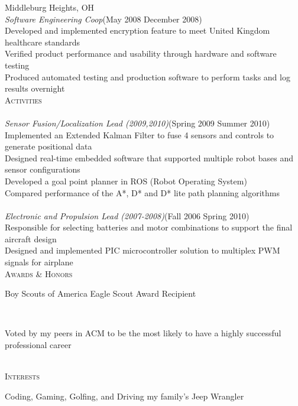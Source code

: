 \documentclass[11pt,letterpaper]{article}
\newcommand{\SectionHeader}[1]{\textsc{#1} \vspace{-2px}\\}
\newcommand{\CompanyHeader}[4]{\hspace*{.52in}{\bf#1} \hfill #2 \\\hspace*{.5in}\emph{#3}\hfill (#4) \vspace{-2px} \\}
\newcommand{\ResumeItem}[1]{\hspace*{.5in}\textopenbullet\hspace*{.2in}#1\\}
\newcommand{\TextBlock}[1]
{\hspace*{.5in} \begin{minipage}[t]{\textwidth -.5in} #1 \end{minipage}\\}
\begin{document}
 \CompanyHeader{Codonics}{Middleburg Heights, OH}{Software Engineering Coop}{May 2008 \textendash
 { }December 2008}
 \ResumeItem{Developed and implemented encryption feature to meet United Kingdom healthcare standards}
 \ResumeItem{Verified product performance and usability through hardware and software testing}
 \ResumeItem{Produced automated testing and production software to perform tasks and log results overnight} 
\SectionHeader{Activities}
\CompanyHeader{Intelligent Ground Vehicle Competition (IGVC)}{}{Sensor Fusion/Localization Lead (2009,2010)}{Spring 2009 \textendash { }Summer 2010}
 \ResumeItem{Implemented an Extended Kalman Filter to fuse 4 sensors and controls to generate positional data}
 \ResumeItem{Designed real-time embedded software that supported multiple robot bases and sensor configurations}
 \ResumeItem{Developed a goal point planner in ROS (Robot Operating System)}
 \ResumeItem{Compared performance of the A*, D* and D* lite path planning algorithms}
 \CompanyHeader{Design Build Fly/DBF}{}{Electronic and Propulsion Lead (2007-2008)}{Fall 2006 \textendash { }Spring 2010}
 \ResumeItem{Responsible for selecting batteries and motor combinations to support the final aircraft design}
\ResumeItem{Designed and implemented PIC microcontroller solution to multiplex PWM signals for airplane}
\SectionHeader{Awards \& Honors}
\TextBlock{Boy Scouts of America Eagle Scout Award Recipient}
\TextBlock{Voted by my peers in ACM to be the most likely to have a highly successful professional career}
\SectionHeader{Interests}
\TextBlock{Coding, Gaming, Golfing, and Driving my family's Jeep Wrangler}
\end{document}
